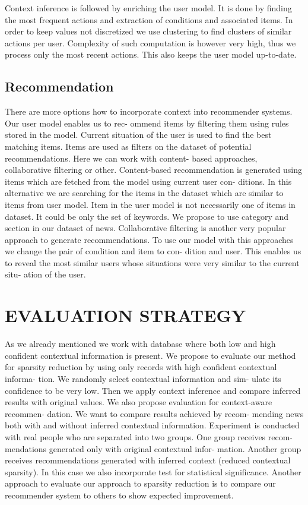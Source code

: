 \documentclass{acm_proc_article-sp}
\begin{document}
Context inference is followed by enriching the user model.
It is done by finding the most frequent actions and extraction
of conditions and associated items. In order to keep values
not discretized we use clustering to find clusters of similar
actions per user. Complexity of such computation is however
very high, thus we process only the most recent actions. This
also keeps the user model up-to-date.

\subsection{Recommendation}
There are more options how to incorporate context into
recommender systems. Our user model enables us to rec-
ommend items by filtering them using rules stored in the
model. Current situation of the user is used to find the best
matching items. Items are used as filters on the dataset of
potential recommendations. Here we can work with content-
based approaches, collaborative filtering or other.
Content-based recommendation is generated using items
which are fetched from the model using current user con-
ditions. In this alternative we are searching for the items
in the dataset which are similar to items from user model.
Item in the user model is not necessarily one of items in
dataset. It could be only the set of keywords. We propose
to use category and section in our dataset of news.
Collaborative filtering is another very popular approach
to generate recommendations. To use our model with this
approaches we change the pair of condition and item to con-
dition and user. This enables us to reveal the most similar
users whose situations were very similar to the current situ-
ation of the user.

\section{EVALUATION STRATEGY}
As we already mentioned we work with database where
both low and high confident contextual information is present.
We propose to evaluate our method for sparsity reduction by
using only records with high confident contextual informa-
tion. We randomly select contextual information and sim-
ulate its confidence to be very low. Then we apply context
inference and compare inferred results with original values.
We also propose evaluation for context-aware recommen-
dation. We want to compare results achieved by recom-
mending news both with and without inferred contextual
information. Experiment is conducted with real people who
are separated into two groups. One group receives recom-
mendations generated only with original contextual infor-
mation. Another group receives recommendations generated
with inferred context (reduced contextual sparsity). In this
case we also incorporate test for statistical significance.
Another approach to evaluate our approach to sparsity
reduction is to compare our recommender system to others
to show expected improvement.
\end{document}
